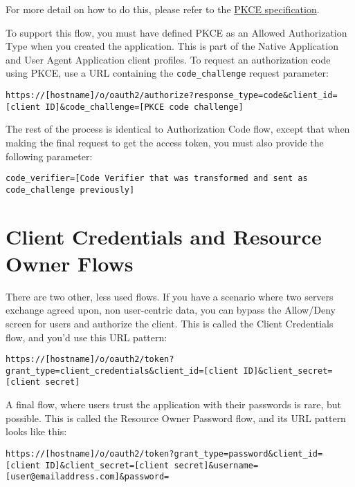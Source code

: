 For more detail on how to do this, please refer to the
\href{https://tools.ietf.org/html/rfc7636}{PKCE specification}.

To support this flow, you must have defined PKCE as an Allowed
Authorization Type when you created the application. This is part of the
Native Application and User Agent Application client profiles. To
request an authorization code using PKCE, use a URL containing the
\texttt{code\_challenge} request parameter:

\begin{verbatim}
https://[hostname]/o/oauth2/authorize?response_type=code&client_id=[client ID]&code_challenge=[PKCE code challenge]
\end{verbatim}

The rest of the process is identical to Authorization Code flow, except
that when making the final request to get the access token, you must
also provide the following parameter:

\begin{verbatim}
code_verifier=[Code Verifier that was transformed and sent as code_challenge previously]
\end{verbatim}

\section{Client Credentials and Resource Owner
Flows}\label{client-credentials-and-resource-owner-flows}

There are two other, less used flows. If you have a scenario where two
servers exchange agreed upon, non user-centric data, you can bypass the
Allow/Deny screen for users and authorize the client. This is called the
Client Credentials flow, and you'd use this URL pattern:

\begin{verbatim}
https://[hostname]/o/oauth2/token?grant_type=client_credentials&client_id=[client ID]&client_secret=[client secret]
\end{verbatim}

A final flow, where users trust the application with their passwords is
rare, but possible. This is called the Resource Owner Password flow, and
its URL pattern looks like this:

\begin{verbatim}
https://[hostname]/o/oauth2/token?grant_type=password&client_id=[client ID]&client_secret=[client secret]&username=[user@emailaddress.com]&password=
\end{verbatim}

